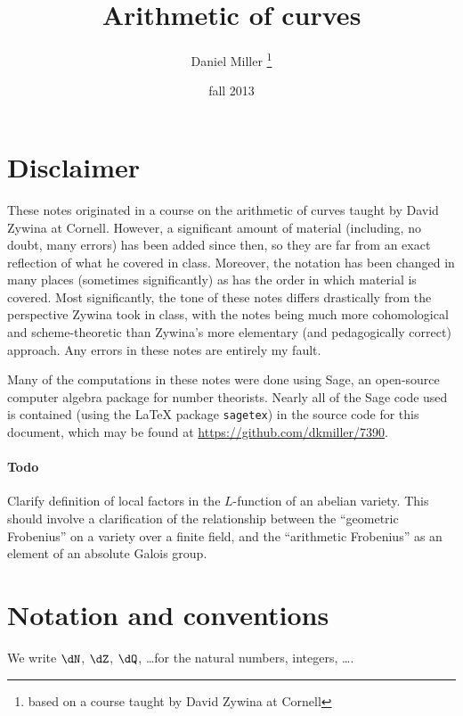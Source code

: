\documentclass{article}
\title{Arithmetic of curves}
\author{Daniel Miller
  \thanks{based on a course taught by David Zywina at Cornell}}
\date{fall 2013}
\begin{document}
\maketitle
\tableofcontents





\newpage
\section*{Disclaimer}

These notes originated in a course on the arithmetic of curves taught by David 
Zywina at Cornell. However, a significant amount of material (including, no 
doubt, many errors) has been added since then, so they are far from an exact 
reflection of what he covered in class. Moreover, the notation has been changed 
in many places (sometimes significantly) as has the order in which material is 
covered. Most significantly, the tone of these notes differs drastically 
from the perspective Zywina took in class, with the notes being much more 
cohomological and scheme-theoretic than Zywina's more elementary (and 
pedagogically correct) approach. Any errors in these notes are entirely my 
fault. 

Many of the computations in these notes were done using Sage, an open-source 
computer algebra package for number theorists. Nearly all of the Sage code 
used is contained (using the \LaTeX{} package \texttt{sagetex}) in the source 
code for this document, which may be found at 
\url{https://github.com/dkmiller/7390}. 


\paragraph{Todo}
Clarify definition of local factors in the $L$-function of an abelian variety. 
This should involve a clarification of the relationship between the ``geometric 
Frobenius'' on a variety over a finite field, and the ``arithmetic Frobenius'' 
as an element of an absolute Galois group. 





\section*{Notation and conventions}

We write $\dN$, $\dZ$, $\dQ$, \ldots for the natural numbers, integers, \ldots. 
\end{document}
